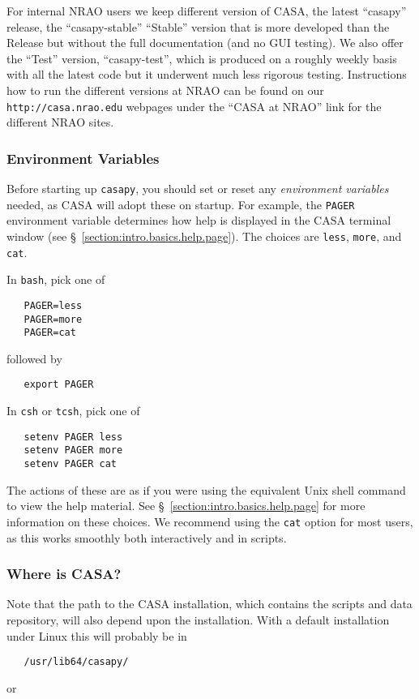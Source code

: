 For internal NRAO users we keep different version of CASA, the latest
``casapy'' release, the ``casapy-stable'' ``Stable'' version that is more
developed than the Release but without the full documentation (and no
GUI testing). We also offer the ``Test'' version, ``casapy-test'', which is
produced on a roughly weekly basis with all the latest code but it
underwent much less rigorous testing. Instructions how to run the
different versions at NRAO can be found on our
\verb=http://casa.nrao.edu= webpages under
the ``CASA at NRAO'' link for the different NRAO sites.


\subsubsection{Environment Variables}
\label{section:intro.basics.before.env}

Before starting up {\tt casapy}, you should set or reset any
{\it environment variables} needed, as CASA will adopt these on startup.  For
example, the {\tt PAGER} environment variable determines how help is
displayed in the CASA terminal window (see
\S~\ref{section:intro.basics.help.page}).  The choices are {\tt less},
{\tt more}, and {\tt cat}.

In {\tt bash}, pick one of
\small
\begin{verbatim}
   PAGER=less
   PAGER=more
   PAGER=cat
\end{verbatim}
\normalsize
followed by
\small
\begin{verbatim}
   export PAGER
\end{verbatim}
\normalsize

In {\tt csh} or {\tt tcsh}, pick one of
\small
\begin{verbatim}
   setenv PAGER less
   setenv PAGER more
   setenv PAGER cat
\end{verbatim}
\normalsize
The actions of these are as if you were using the equivalent Unix
shell command to view the help material.  See
\S~\ref{section:intro.basics.help.page} for more information on these
choices.
We recommend using the {\tt cat} option for most users, as this works
smoothly both interactively and in scripts.

\subsubsection{Where is CASA?}
\label{section:intro.basics.before.path}

Note that the path to the CASA installation, which contains
the scripts and data repository, will also depend upon the 
installation.  With a default installation under Linux this
will probably be in
\small
\begin{verbatim}
   /usr/lib64/casapy/
\end{verbatim}
\normalsize
or 

